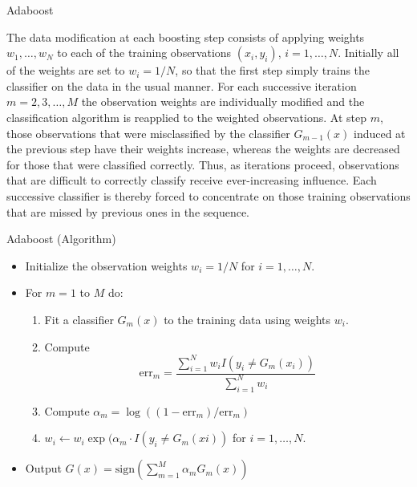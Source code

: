 \documentclass{beamer}
\begin{document}
\begin{frame}{Adaboost}
	
	The data modification at each boosting step consists of applying weights $w_1,\ldots, w_N$ to each of the training observations $(x_i,y_i)$, $i=1,\ldots, N$. Initially all of the weights are set to $w_i = 1/N$, so that the first step simply trains the classifier on the data in the usual manner. For each successive iteration $m=2,3, \ldots, M$ the observation weights are individually modified and the classification algorithm is reapplied to the weighted observations. At step $m$, those observations that were misclassified by the classifier $G_{m-1}(x)$ induced at the previous step have their weights increase, whereas the weights are decreased for those that were classified correctly. Thus, as iterations proceed, observations that are difficult to correctly classify receive ever-increasing influence. Each successive classifier is thereby forced to concentrate on those training observations that are missed by previous ones in the sequence. 
	
\end{frame}
\begin{frame}{Adaboost (Algorithm)}
	\begin{itemize}
		\item Initialize the observation weights $w_i=1/N$ for $i=1,\ldots, N$.
		\item For $m=1$ to $M$ do:
		\begin{enumerate}
			\item Fit a classifier $G_m(x)$ to the training data using weights $w_i$.
			\item Compute
			\begin{equation*}
				\text{err}_m = \frac{\sum_{i=1}^N w_i I(y_i\ne G_m(x_i))}{\sum_{i=1}^{N}w_i}
			\end{equation*}
			\item Compute $\alpha_m = \log((1- \text{err}_m)/\text{err}_m)$
			\item $w_i \leftarrow w_i \exp( \alpha_m \cdot I (y_i \ne G_m(xi))$ for $i=1, \ldots, N$.
		\end{enumerate}
	\item Output $G(x)= \text{sign} \left(\sum_{m=1}^M\alpha_m G_m(x)\right)$
	\end{itemize}
\end{frame}
\end{document}
